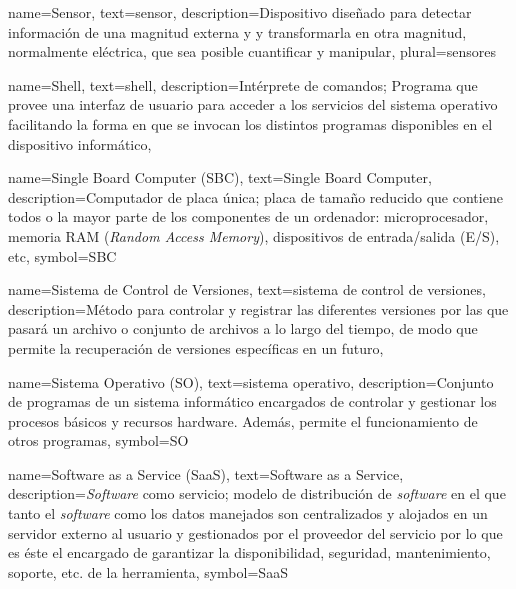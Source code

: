 {
    name={Sensor},
    text={sensor},
    description={Dispositivo diseñado para detectar información de una magnitud externa y y transformarla en otra magnitud, normalmente eléctrica, que sea posible cuantificar y manipular},
    plural={sensores}
}

{
    name={Shell},
    text={shell},
    description={Intérprete de comandos; Programa que provee una interfaz de usuario para acceder a los servicios del sistema operativo facilitando la forma en que se invocan los distintos programas disponibles en el dispositivo informático},
}

{
    name={Single Board Computer (SBC)},
    text={Single Board Computer},
    description={Computador de placa única; placa de tamaño reducido que contiene todos o la mayor parte de los componentes de un ordenador: microprocesador, memoria RAM (\textit{Random Access Memory}), dispositivos de entrada/salida (E/S), etc},
    symbol={SBC}
}

{
    name={Sistema de Control de Versiones},
    text={sistema de control de versiones},
    description={Método para controlar y registrar las diferentes versiones por las que pasará un archivo o conjunto de archivos a lo largo del tiempo, de modo que permite la recuperación de versiones específicas en un futuro},
}

{
    name={Sistema Operativo (SO)},
    text={sistema operativo},
    description={Conjunto de programas de un sistema informático encargados de controlar y gestionar los procesos básicos y recursos hardware. Además, permite el funcionamiento de otros programas},
    symbol={SO}
}

{
    name={Software as a Service (SaaS)},
    text={Software as a Service},
    description={\textit{Software} como servicio; modelo de distribución de \textit{software} en el que tanto el \textit{software} como los datos manejados son centralizados y alojados en un servidor externo al usuario y gestionados por el proveedor del servicio por lo que es éste el encargado de garantizar la disponibilidad, seguridad, mantenimiento, soporte, etc. de la herramienta},
    symbol={SaaS}
}

